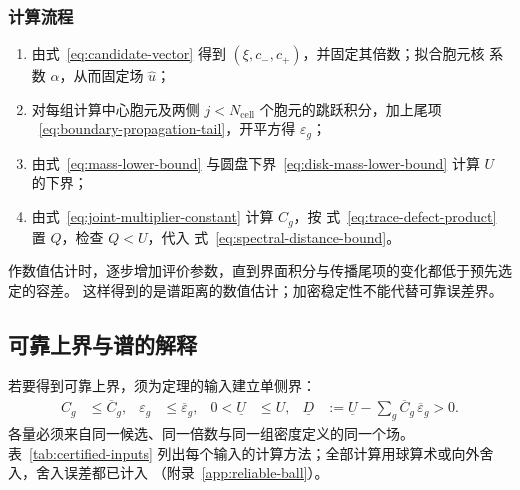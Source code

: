 \subsubsection{计算流程}

\begin{enumerate}
  \item 由式~\eqref{eq:candidate-vector} 得到 $(\xi,c_-,c_+)$，并固定其倍数；拟合胞元核
    系数 $\alpha$，从而固定场 $\widehat u$；
  \item 对每组计算中心胞元及两侧 $j<N_{\mathrm{cell}}$ 个胞元的跳跃积分，加上尾项
    ~\eqref{eq:boundary-propagation-tail}，开平方得 $\varepsilon_g$；
  \item 由式~\eqref{eq:mass-lower-bound} 与圆盘下界~\eqref{eq:disk-mass-lower-bound}
    计算 $U$ 的下界；
  \item 由式~\eqref{eq:joint-multiplier-constant} 计算 $C_g$，按
    式~\eqref{eq:trace-defect-product} 置 $Q$，检查 $Q<U$，代入
    式~\eqref{eq:spectral-distance-bound}。
\end{enumerate}
作数值估计时，逐步增加评价参数，直到界面积分与传播尾项的变化都低于预先选定的容差。
这样得到的是谱距离的数值估计；加密稳定性不能代替可靠误差界。

\subsection{可靠上界与谱的解释}
\label{subsec:certified}

若要得到可靠上界，须为定理的输入建立单侧界：
\begin{align}
  C_g&\leq\overline C_g,
  &\varepsilon_g&\leq\overline\varepsilon_g,
  &0<\underline U&\leq U,
  &\underline D&:=\underline U-\sum_g\overline C_g\,\overline\varepsilon_g>0.
  \label{eq:certified-inputs}
\end{align}
各量必须来自同一候选、同一倍数与同一组密度定义的同一个场。表~\ref{tab:certified-inputs}
列出每个输入的计算方法；全部计算用球算术或向外舍入，舍入误差都已计入
（附录~\ref{app:reliable-ball}）。

